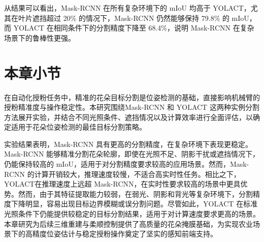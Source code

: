 从结果可以看出，Mask-RCNN 在所有复杂环境下的 mIoU 均高于 YOLACT，尤其在叶片遮挡超过 20\% 的情况下，Mask-RCNN 仍然能够保持 79.8\% 的 mIoU，而 YOLACT 在相同条件下的分割精度下降至 68.4\%，说明 Mask-RCNN 在复杂场景下的鲁棒性更强。
\section{本章小节}
在自动化授粉任务中，精准的花朵目标分割是位姿检测的基础，直接影响机械臂的授粉精准度与操作稳定性。本研究围绕Mask-RCNN 和 YOLACT 这两种实例分割方法展开实验，并结合不同光照条件、遮挡情况以及计算效率进行全面评估，以确定适用于花朵位姿检测的最佳目标分割策略。

实验结果表明，Mask-RCNN 具有更高的分割精度，在复杂环境下表现更稳定。Mask-RCNN 能够精准分割花朵轮廓，即使在光照不足、阴影干扰或遮挡情况下，仍能保持较高的 mIoU，适用于对分割精度要求较高的应用场景。然而，Mask-RCNN 的计算开销较大，推理速度较慢，不适合高实时性任务。相比之下，YOLACT在推理速度上远超 Mask-RCNN，在实时性要求较高的场景中更具优势。然而，由于其特征提取能力较弱，在弱光、阴影和背光等复杂环境下，分割精度下降明显，容易出现目标边界模糊或误分割问题。尽管如此，YOLACT 在标准光照条件下仍能提供较稳定的目标分割结果，适用于对计算速度要求更高的场景。
本章研究为后续三维重建与柔顺控制提供了高质量的花朵掩膜基础，为实现农业场景下的高精度位姿估计与稳定授粉操作奠定了坚实的感知前端支持。


